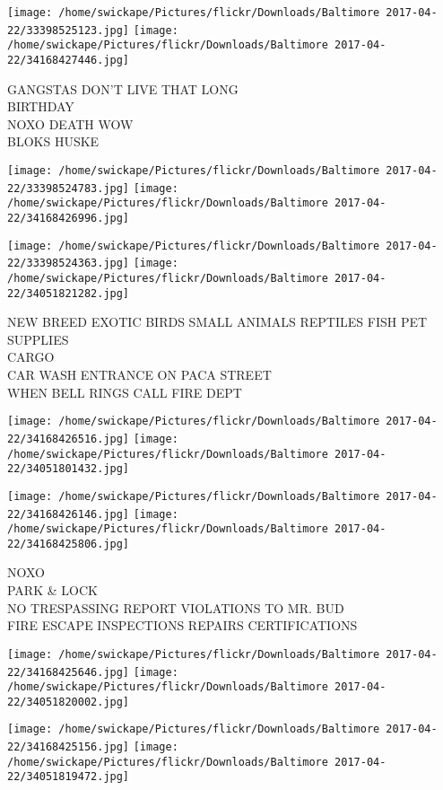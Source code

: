 \documentclass[10pt,letterpaper]{article}
\begin{document}
\texttt{[image: /home/swickape/Pictures/flickr/Downloads/Baltimore 2017-04-22/33398525123.jpg]}
\texttt{[image: /home/swickape/Pictures/flickr/Downloads/Baltimore 2017-04-22/34168427446.jpg]}

GANGSTAS DON'T LIVE THAT LONG\\
BIRTHDAY\\
NOXO DEATH WOW\\
BLOKS HUSKE
\pagebreak

\texttt{[image: /home/swickape/Pictures/flickr/Downloads/Baltimore 2017-04-22/33398524783.jpg]}
\texttt{[image: /home/swickape/Pictures/flickr/Downloads/Baltimore 2017-04-22/34168426996.jpg]}

\texttt{[image: /home/swickape/Pictures/flickr/Downloads/Baltimore 2017-04-22/33398524363.jpg]}
\texttt{[image: /home/swickape/Pictures/flickr/Downloads/Baltimore 2017-04-22/34051821282.jpg]}

NEW BREED EXOTIC BIRDS SMALL ANIMALS REPTILES FISH PET SUPPLIES\\
CARGO\\
CAR WASH ENTRANCE ON PACA STREET\\
WHEN BELL RINGS CALL FIRE DEPT
\pagebreak

\texttt{[image: /home/swickape/Pictures/flickr/Downloads/Baltimore 2017-04-22/34168426516.jpg]}
\texttt{[image: /home/swickape/Pictures/flickr/Downloads/Baltimore 2017-04-22/34051801432.jpg]}

\texttt{[image: /home/swickape/Pictures/flickr/Downloads/Baltimore 2017-04-22/34168426146.jpg]}
\texttt{[image: /home/swickape/Pictures/flickr/Downloads/Baltimore 2017-04-22/34168425806.jpg]}

NOXO\\
PARK \& LOCK\\
NO TRESPASSING REPORT VIOLATIONS TO MR. BUD\\
FIRE ESCAPE INSPECTIONS REPAIRS CERTIFICATIONS
\pagebreak

\texttt{[image: /home/swickape/Pictures/flickr/Downloads/Baltimore 2017-04-22/34168425646.jpg]}
\texttt{[image: /home/swickape/Pictures/flickr/Downloads/Baltimore 2017-04-22/34051820002.jpg]}

\texttt{[image: /home/swickape/Pictures/flickr/Downloads/Baltimore 2017-04-22/34168425156.jpg]}
\texttt{[image: /home/swickape/Pictures/flickr/Downloads/Baltimore 2017-04-22/34051819472.jpg]}
\end{document}
